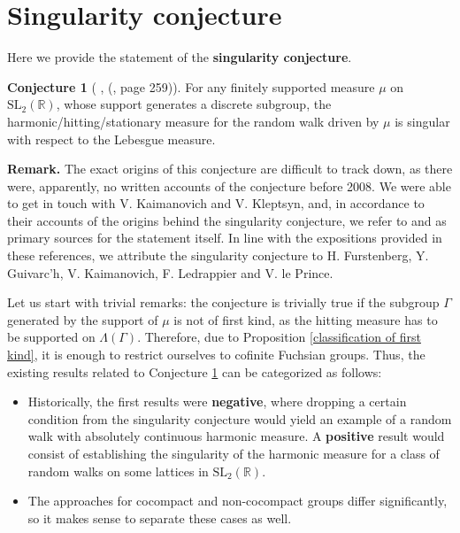 \documentclass[11pt]{amsart}
\theoremstyle{definition}
\newtheorem{conjecture}{Conjecture}[section]
\begin{document}
			
	\section{Singularity conjecture}
	
	Here we provide the statement of the \textbf{singularity conjecture}.
	\begin{conjecture}[ \cite{MR2568439}, (\cite{kaimanovich2011matrix}, page 259)]
		\label{Fuchsian singularity conjecture}
		For any finitely supported measure $\mu$ on $\text{SL}_2(\mathbb{R})$, whose support generates a discrete subgroup, the harmonic/hitting/stationary measure for the random walk driven by $\mu$ is singular with respect to the Lebesgue measure.
	\end{conjecture}
	
	\textbf{Remark.} The exact origins of this conjecture are difficult to track down, as there were, apparently, no written accounts of the conjecture before 2008. We were able to get in touch with V. Kaimanovich and V. Kleptsyn, and, in accordance to their accounts of the origins behind the singularity conjecture, we refer to \cite{MR2568439} and \cite{kaimanovich2011matrix} as primary sources for the statement itself. In line with the expositions provided in these references, we attribute the singularity conjecture to H. Furstenberg, Y. Guivarc'h, V. Kaimanovich, F. Ledrappier and V. le Prince. 
	
	Let us start with trivial remarks: the conjecture is trivially true if the subgroup $\Gamma$ generated by the support of $\mu$ is not of first kind, as the hitting measure has to be supported on $\Lambda(\Gamma)$. Therefore, due to Proposition \ref{classification of first kind}, it is enough to restrict ourselves to cofinite Fuchsian groups. Thus, the existing results related to Conjecture \ref{Fuchsian singularity conjecture} can be categorized as follows:
	
	\begin{itemize}
		\item Historically, the first results were \textbf{negative}, where dropping a certain condition from the singularity conjecture would yield an example of a random walk with absolutely continuous harmonic measure. A \textbf{positive} result would consist of establishing the singularity of the harmonic measure for a class of random walks on some lattices in $\text{SL}_2(\mathbb{R})$.
		\item The approaches for cocompact and non-cocompact groups differ significantly, so it makes sense to separate these cases as well.
	\end{itemize}
	
\end{document}
